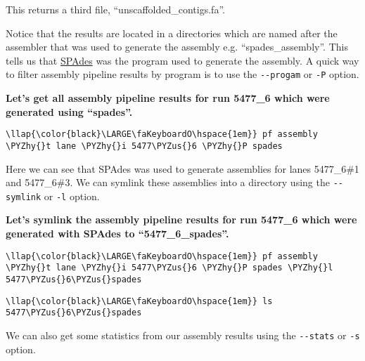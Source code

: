 \documentclass[11pt]{article}
\def\PYZus{\char`\_}
\def\PYZhy{\char`\-}
\begin{document}
    This returns a third file, ``unscaffolded\_contigs.fa''.

Notice that the results are located in a directories which are named
after the assembler that was used to generate the assembly e.g.
``spades\_assembly''. This tells us that
\href{http://cab.spbu.ru/software/spades/}{SPAdes} was the program used
to generate the assembly. A quick way to filter assembly pipeline
results by program is to use the \texttt{-\/-progam} or \texttt{-P}
option.

\textbf{Let's get all assembly pipeline results for run 5477\_6 which
were generated using ``spades''.}

\begin{terminalinput}
\begin{Verbatim}[commandchars=\\\{\}]
\llap{\color{black}\LARGE\faKeyboardO\hspace{1em}} pf assembly \PYZhy{}t lane \PYZhy{}i 5477\PYZus{}6 \PYZhy{}P spades
\end{Verbatim}
\end{terminalinput}

    Here we can see that SPAdes was used to generate assemblies for lanes
5477\_6\#1 and 5477\_6\#3. We can symlink these assemblies into a
directory using the \texttt{-\/-symlink} or \texttt{-l} option.

\textbf{Let's symlink the assembly pipeline results for run 5477\_6
which were generated with SPAdes to ``5477\_6\_spades''.}

\begin{terminalinput}
\begin{Verbatim}[commandchars=\\\{\}]
\llap{\color{black}\LARGE\faKeyboardO\hspace{1em}} pf assembly \PYZhy{}t lane \PYZhy{}i 5477\PYZus{}6 \PYZhy{}P spades \PYZhy{}l 5477\PYZus{}6\PYZus{}spades
\end{Verbatim}
\end{terminalinput}

\begin{terminalinput}
\begin{Verbatim}[commandchars=\\\{\}]
\llap{\color{black}\LARGE\faKeyboardO\hspace{1em}} ls 5477\PYZus{}6\PYZus{}spades
\end{Verbatim}
\end{terminalinput}

    We can also get some statistics from our assembly results using the
\texttt{-\/-stats} or \texttt{-s} option.
\end{document}
